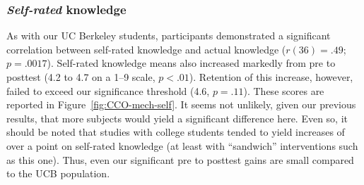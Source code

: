 \subsubsection{\emph{Self-rated} knowledge}

As with our UC Berkeley students, participants demonstrated a significant correlation
between self-rated knowledge and actual knowledge ($r(36)=.49$; $p = .0017$).  
Self-rated knowledge means also increased markedly from pre to posttest (4.2
to 4.7 on a 1--9 scale, $p<.01$). Retention of this increase, however,
failed to exceed our significance threshold (4.6, $p=.11$). These scores are
reported in Figure~\ref{fig:CCO-mech-self}. It seems not unlikely, given our
previous results, that more subjects would yield a significant difference here.
Even so, it should be noted that studies with college students tended to yield
increases of over a point on self-rated knowledge (at least with “sandwich”
interventions such as this one). Thus, even our significant pre to posttest
gains are small compared to the UCB population.

